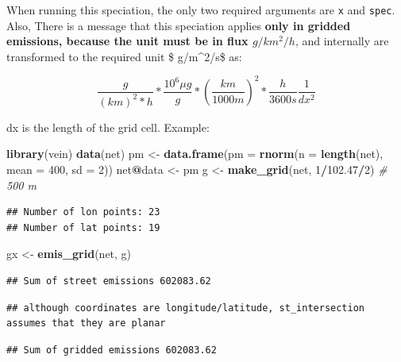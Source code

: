 \documentclass[12pt,graybox,envcountchap,sectrefs]{krantz}
\makeatletter
\newenvironment{Shaded}{\begin{snugshade}}{\end{snugshade}}
\newcommand{\KeywordTok}[1]{\textcolor[rgb]{0.13,0.29,0.53}{\textbf{#1}}}
\newcommand{\DataTypeTok}[1]{\textcolor[rgb]{0.13,0.29,0.53}{#1}}
\newcommand{\DecValTok}[1]{\textcolor[rgb]{0.00,0.00,0.81}{#1}}
\newcommand{\FloatTok}[1]{\textcolor[rgb]{0.00,0.00,0.81}{#1}}
\newcommand{\StringTok}[1]{\textcolor[rgb]{0.31,0.60,0.02}{#1}}
\newcommand{\CommentTok}[1]{\textcolor[rgb]{0.56,0.35,0.01}{\textit{#1}}}
\newcommand{\OperatorTok}[1]{\textcolor[rgb]{0.81,0.36,0.00}{\textbf{#1}}}
\newcommand{\NormalTok}[1]{#1}
\newenvironment{kframe}{%
\medskip{}
\setlength{\fboxsep}{.8em}
 \def\at@end@of@kframe{}%
 \ifinner\ifhmode%
  \def\at@end@of@kframe{\end{minipage}}%
  \begin{minipage}{\columnwidth}%
 \fi\fi%
 \def\FrameCommand##1{\hskip\@totalleftmargin \hskip-\fboxsep
 \colorbox{shadecolor}{##1}\hskip-\fboxsep
     \hskip-\linewidth \hskip-\@totalleftmargin \hskip\columnwidth}%
 \MakeFramed {\advance\hsize-\width
   \@totalleftmargin\z@ \linewidth\hsize
   \@setminipage}}%
 {\par\unskip\endMakeFramed%
 \at@end@of@kframe}
\renewenvironment{Shaded}{\begin{kframe}}{\end{kframe}}
\theoremstyle{definition}
\theoremstyle{definition}
\theoremstyle{definition}
\theoremstyle{remark}
\makeatother
\begin{document}
When running this speciation, the only two required arguments are
\texttt{x} and \texttt{spec}. Also, There is a message that this
speciation applies \textbf{only in gridded emissions, because the unit
must be in flux \(g/km^2/h\)}, and internally are transformed to the
required unit \$ \mu g/m\^{}2/s\$ as:

\[ \frac{g}{(km)^2*h}*\frac{10^6 \mu g}{g}*(\frac{km}{1000m})^2*\frac{h}{3600s}\frac{1}{dx^2}\]

dx is the length of the grid cell. Example:

\begin{Shaded}
\begin{Highlighting}[]
\KeywordTok{library}\NormalTok{(vein)}
\KeywordTok{data}\NormalTok{(net)}
\NormalTok{pm <-}\StringTok{ }\KeywordTok{data.frame}\NormalTok{(}\DataTypeTok{pm =} \KeywordTok{rnorm}\NormalTok{(}\DataTypeTok{n =} \KeywordTok{length}\NormalTok{(net), }\DataTypeTok{mean =} \DecValTok{400}\NormalTok{, }\DataTypeTok{sd =} \DecValTok{2}\NormalTok{))}
\NormalTok{net}\OperatorTok{@}\NormalTok{data <-}\StringTok{ }\NormalTok{pm}
\NormalTok{g <-}\StringTok{ }\KeywordTok{make_grid}\NormalTok{(net, }\DecValTok{1}\OperatorTok{/}\FloatTok{102.47}\OperatorTok{/}\DecValTok{2}\NormalTok{) }\CommentTok{# 500 m}
\end{Highlighting}
\end{Shaded}

\begin{verbatim}
## Number of lon points: 23
## Number of lat points: 19
\end{verbatim}

\begin{Shaded}
\begin{Highlighting}[]
\NormalTok{gx <-}\StringTok{ }\KeywordTok{emis_grid}\NormalTok{(net, g)}
\end{Highlighting}
\end{Shaded}

\begin{verbatim}
## Sum of street emissions 602083.62
\end{verbatim}

\begin{verbatim}
## although coordinates are longitude/latitude, st_intersection assumes that they are planar
\end{verbatim}

\begin{verbatim}
## Sum of gridded emissions 602083.62
\end{verbatim}
\end{document}
